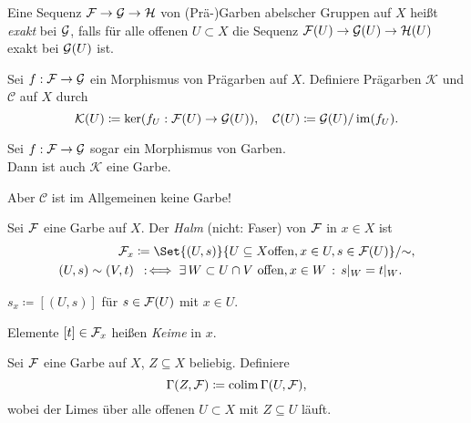 \documentclass{cheat-sheet}
\begin{document}


\begin{defn}
  Eine Sequenz $\mathcal{F} \to \mathcal{G} \to \mathcal{H}$ von (Prä-)Garben abelscher Gruppen auf $X$ heißt \emph{exakt} bei $\mathcal{G}$, falls für alle offenen $U \subset X$ die Sequenz $\mathcal{F}(U) \to \mathcal{G}(U) \to \mathcal{H}(U)$ exakt bei $\mathcal{G}(U)$ ist.
\end{defn}

\begin{defn}
  Sei $f : \mathcal{F} \to \mathcal{G}$ ein Morphismus von Prägarben auf $X$. Definiere Prägarben $\mathcal{K}$ und $\mathcal{C}$ auf $X$ durch
  \[
    \mathcal{K}(U) \coloneqq \ker (f_U : \mathcal{F}(U) \to \mathcal{G}(U)), \quad
    \mathcal{C}(U) \coloneqq \mathcal{G}(U) / \operatorname{im} (f_U).
  \]
\end{defn}

\begin{prop}
  Sei $f : \mathcal{F} \to \mathcal{G}$ sogar ein Morphismus von Garben. \\
  Dann ist auch $\mathcal{K}$ eine Garbe.
\end{prop}

\begin{acht}
  Aber $\mathcal{C}$ ist im Allgemeinen keine Garbe!
\end{acht}


\begin{defn}
  Sei $\mathcal{F}$ eine Garbe auf $X$. Der \emph{Halm} (nicht: Faser) von $\mathcal{F}$ in $x \in X$ ist
  \begin{align*}
    \Fais_x & \coloneqq \Set{(U, s)}{U \subseteq X \text{offen}, x \in U, s \in \Fais(U)} / {\sim}, \\
    (U, s) \sim (V, t) & \coloniff \ex{W \subset U \cap V \text{ offen}, x \in W} s|_W = t|_W.
  \end{align*}
\end{defn}

\begin{nota}
  $s_x \coloneqq [(U, s)]$ für $s \in \mathcal{F}(U)$ mit $x \in U$.
\end{nota}

\begin{sprech}
  Elemente $[t] \in \mathcal{F}_x$ heißen \emph{Keime} in $x$.
\end{sprech}

\begin{defn}
  Sei $\mathcal{F}$ eine Garbe auf $X$, $Z \subseteq X$ beliebig. Definiere
  \[ \Gamma(Z, \mathcal{F}) \coloneqq \operatorname{colim} \Gamma(U, \mathcal{F}), \]
  wobei der Limes über alle offenen $U \subset X$ mit $Z \subseteq U$ läuft.
\end{defn}
\end{document}
